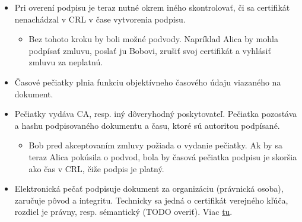\documentclass[12pt,a4paper]{article}
\begin{document}
{\begin{itemize}
        \begin{itemize}
            \item identifikačné údaje CA
            \item dátum a čas vydania CRL
            \item dátum a čas najneskoršieho vydania nového CRL
            \item zoznam identifikačných čísel zrušených certifikátov
            \item elektronický podpis certifikačnej autority
        \end{itemize}
        \item Pri overení podpisu je teraz nutné okrem iného skontrolovať, či sa certifikát nenachádzal v CRL v čase vytvorenia podpisu.
        \begin{itemize}
            \item Bez tohoto kroku by boli možné podvody. Napríklad Alica by mohla podpísať zmluvu, poslať ju Bobovi, zrušiť svoj certifikát a vyhlásiť zmluvu za neplatnú. 
        \end{itemize}
        \item Časové pečiatky plnia funkciu objektívneho časového údaju viazaného na dokument.
        \item Pečiatky vydáva CA, resp. iný dôveryhodný poskytovateľ. Pečiatka pozostáva a hashu podpisovaného dokumentu a času, ktoré sú autoritou podpísané.
        \begin{itemize}
            \item Bob pred akceptovaním zmluvy požiada o vydanie pečiatky. Ak by sa teraz Alica pokúsila o podvod, bola by časová pečiatka podpisu je skoršia ako čas v CRL, čiže podpis je platný.
        \end{itemize}
        \item Elektronická pečať podpisuje dokument za organizáciu (právnická osoba), zaručuje pôvod a integritu. Technicky sa jedná o certifikát verejného kľúča, rozdiel je právny, resp. sémantický (TODO overiť). Viac \href{https://snca.gov.sk/kvalifikovane-sluzby/elektronicka-pecat}{tu}.
    \end{itemize}
}
\end{document}
